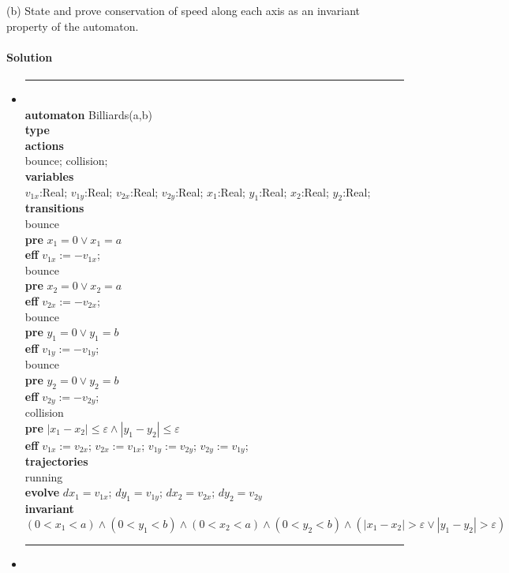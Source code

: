 \documentclass[11pt]{article}
\newcommand{\tab}{\hspace*{5mm}}
\begin{document}
(b) State and prove conservation of speed along each axis as an invariant property of the automaton.

\paragraph{Solution}
\begin{itemize}[(a)]
\item
\noindent\rule{7cm}{1.0pt}\\
\textbf{automaton} Billiards(a,b)\\
\tab\textbf{type}\\
\tab\textbf{actions}\\
\tab\tab bounce; collision;\\
\tab\textbf{variables}\\
\tab\tab $v_{1x}$:Real; $v_{1y}$:Real; $v_{2x}$:Real; $v_{2y}$:Real; $x_1$:Real; $y_1$:Real; $x_2$:Real; $y_2$:Real;\\
\tab\textbf{transitions}\\
\tab\tab bounce\\
\tab\tab \textbf{pre} $x_1 = 0 \vee x_1 = a$\\
\tab\tab \textbf{eff} $v_{1x} := -v_{1x}$;\\
\tab\tab bounce\\
\tab\tab \textbf{pre} $x_2 = 0 \vee x_2 = a$\\
\tab\tab \textbf{eff} $v_{2x} := -v_{2x}$;\\
\tab\tab bounce\\
\tab\tab \textbf{pre} $y_1 = 0 \vee y_1 = b$\\
\tab\tab \textbf{eff} $v_{1y} := -v_{1y}$;\\
\tab\tab bounce\\
\tab\tab \textbf{pre} $y_2 = 0 \vee y_2 = b$\\
\tab\tab \textbf{eff} $v_{2y} := -v_{2y}$;\\
\tab\tab collision\\
\tab\tab \textbf{pre} $|x_1-x_2| \leq \varepsilon \wedge |y_1-y_2| \leq \varepsilon$\\
\tab\tab \textbf{eff} $v_{1x} := v_{2x}$; $v_{2x} := v_{1x}$; $v_{1y} := v_{2y}$; $v_{2y} := v_{1y}$;\\
\tab\textbf{trajectories}\\
\tab\tab running\\
\tab\tab \textbf{evolve} $dx_1 = v_{1x}$; $dy_1 = v_{1y}$; $dx_2 = v_{2x}$; $dy_2 = v_{2y}$\\
\tab\tab \textbf{invariant} $(0<x_1<a) \wedge (0<y_1<b) \wedge (0<x_2<a) \wedge (0<y_2<b) \wedge (|x_1-x_2| > \varepsilon \vee |y_1-y_2| > \varepsilon)$\\

\noindent\rule{7cm}{1.0pt}

\item

\end{itemize}
\end{document}
